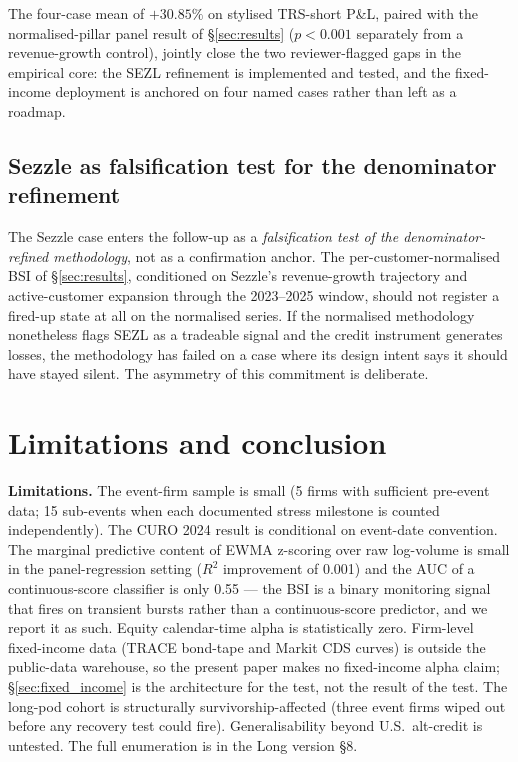 \documentclass[11pt,a4paper]{article}
\begin{document}
The four-case mean of $+30.85\%$ on stylised TRS-short P\&L, paired with the normalised-pillar panel result of §\ref{sec:results} ($p < 0.001$ separately from a revenue-growth control), jointly close the two reviewer-flagged gaps in the empirical core: the SEZL refinement is implemented and tested, and the fixed-income deployment is anchored on four named cases rather than left as a roadmap.

\subsection*{Sezzle as falsification test for the denominator refinement}

The Sezzle case enters the follow-up as a \emph{falsification test of the denominator-refined methodology}, not as a confirmation anchor. The per-customer-normalised BSI of §\ref{sec:results}, conditioned on Sezzle's revenue-growth trajectory and active-customer expansion through the 2023--2025 window, should not register a fired-up state at all on the normalised series. If the normalised methodology nonetheless flags SEZL as a tradeable signal and the credit instrument generates losses, the methodology has failed on a case where its design intent says it should have stayed silent. The asymmetry of this commitment is deliberate.

\section{Limitations and conclusion}\label{sec:concl}

\textbf{Limitations.} The event-firm sample is small (5 firms with sufficient pre-event data; 15 sub-events when each documented stress milestone is counted independently). The CURO 2024 result is conditional on event-date convention. The marginal predictive content of EWMA z-scoring over raw log-volume is small in the panel-regression setting ($R^2$ improvement of 0.001) and the AUC of a continuous-score classifier is only 0.55 --- the BSI is a binary monitoring signal that fires on transient bursts rather than a continuous-score predictor, and we report it as such. Equity calendar-time alpha is statistically zero. Firm-level fixed-income data (TRACE bond-tape and Markit CDS curves) is outside the public-data warehouse, so the present paper makes no fixed-income alpha claim; §\ref{sec:fixed_income} is the architecture for the test, not the result of the test. The long-pod cohort is structurally survivorship-affected (three event firms wiped out before any recovery test could fire). Generalisability beyond U.S.\ alt-credit is untested. The full enumeration is in the Long version §8.
\end{document}
